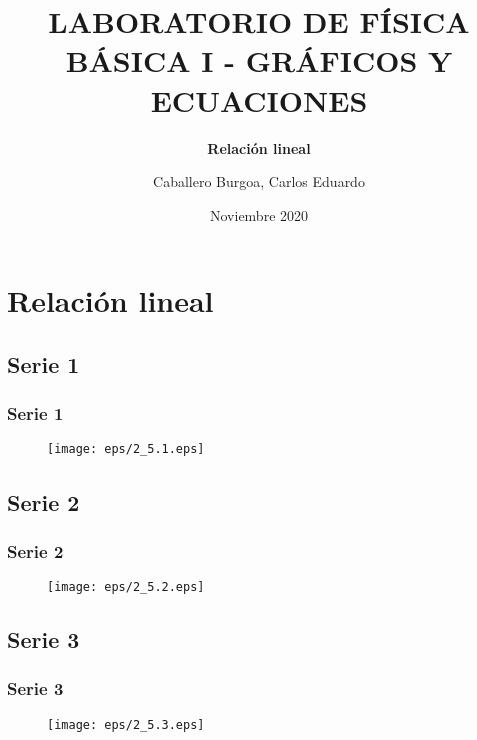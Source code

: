 \documentclass[letter,11pt]{beamer}
\title{\textbf{LABORATORIO DE FÍSICA BÁSICA I - GRÁFICOS Y ECUACIONES}}
\subtitle{\textbf{Relación lineal}}
\author{\small{Caballero Burgoa, Carlos Eduardo}}
\date{\tiny{Noviembre 2020}}
\begin{document}
\begin{frame}
\titlepage
\end{frame}

\section{Relación lineal}

\subsection{Serie 1}
\begin{frame}
\frametitle{Serie 1}
    \begin{figure}[!h]
        \centering
        \texttt{[image: eps/2\_5.1.eps]}
    \end{figure}
\end{frame}

\subsection{Serie 2}
\begin{frame}
\frametitle{Serie 2}
    \begin{figure}[!h]
        \centering
        \texttt{[image: eps/2\_5.2.eps]}
    \end{figure}
\end{frame}

\subsection{Serie 3}
\begin{frame}
\frametitle{Serie 3}
    \begin{figure}[!h]
        \centering
        \texttt{[image: eps/2\_5.3.eps]}
    \end{figure}
\end{frame}
\end{document}
